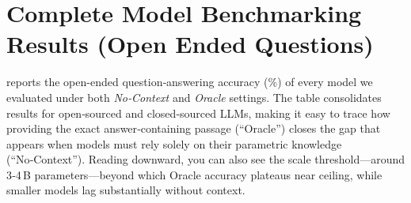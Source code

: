 \documentclass[11pt]{article}
\begin{document}
\clearpage
\section{Complete Model Benchmarking Results (Open Ended Questions)}
\label{sec:appendix-model-results_open_ended}

 reports the open-ended question‑answering accuracy (\%) of every
model we evaluated under both \emph{No‑Context} and \emph{Oracle} settings.
The table consolidates results for open‑sourced and closed‑sourced LLMs,
making it easy to trace how providing the exact answer‑containing passage
(“Oracle”) closes the gap that appears when models must rely solely on their
parametric knowledge (“No‑Context”).  Reading downward, you can also see the
scale threshold—around 3‑4 B parameters—beyond which Oracle accuracy plateaus
near ceiling, while smaller models lag substantially without context.
\end{document}
